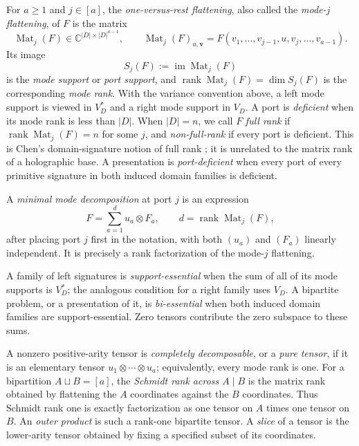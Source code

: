 \documentclass[11pt]{article}
\theoremstyle{definition}
\theoremstyle{remark}
\newcommand{\C}{\mathbb C}
\newcommand{\Mat}{\operatorname{Mat}}
\newcommand{\rank}{\operatorname{rank}}
\begin{document}
For $a\ge1$ and $j\in[a]$, the \emph{one-versus-rest flattening}, also
called the \emph{mode-$j$ flattening}, of $F$ is the matrix
\begin{equation}
  \Mat_j(F)\in\C^{|D|\times |D|^{a-1}},
  \qquad
  \Mat_j(F)_{u,\mathbf v}
  =F(v_1,\ldots,v_{j-1},u,v_j,\ldots,v_{a-1}).
  \label{eq:flattening-definition}
\end{equation}
Its image
\begin{equation}
  S_j(F):=\operatorname{im}\Mat_j(F)
  \label{eq:mode-support-definition}
\end{equation}
is the \emph{mode support} or \emph{port support}, and
$\rank\Mat_j(F)=\dim S_j(F)$ is the corresponding \emph{mode rank}.  With
the variance convention above, a left mode support is viewed in $V_D^*$
and a right mode support in $V_D$.  A port is \emph{deficient} when its
mode rank is less than $|D|$.  When $|D|=n$, we call $F$ \emph{full rank}
if $\rank\Mat_j(F)=n$ for some $j$, and \emph{non-full-rank} if every port
is deficient.  This is Chen's domain-signature notion of full rank
\cite{Chen2016}; it is unrelated to the matrix rank of a holographic base.
A presentation is \emph{port-deficient} when every port of every primitive
signature in both induced domain families is deficient.

A \emph{minimal mode decomposition} at port $j$ is an expression
\[
  F=\sum_{a=1}^{d}u_a\otimes F_a,
  \qquad d=\rank\Mat_j(F),
\]
after placing port $j$ first in the notation, with both $(u_a)$ and
$(F_a)$ linearly independent.  It is precisely a rank factorization of the
mode-$j$ flattening.

A family of left signatures is \emph{support-essential} when the sum of
all of its mode supports is $V_D^*$; the analogous condition for a right
family uses $V_D$.  A bipartite problem, or a presentation of it, is
\emph{bi-essential} when both induced domain families are
support-essential.  Zero tensors contribute the zero subspace to these
sums.

A nonzero positive-arity tensor is \emph{completely decomposable}, or a
\emph{pure tensor}, if it is an elementary tensor
$u_1\otimes\cdots\otimes u_a$; equivalently, every mode rank is one.  For a
bipartition $A\sqcup B=[a]$, the \emph{Schmidt rank across $A\mid B$} is
the matrix rank obtained by flattening the $A$ coordinates against the $B$
coordinates.  Thus Schmidt rank one is exactly factorization as one tensor
on $A$ times one tensor on $B$.  An \emph{outer product} is such a
rank-one bipartite tensor.
A \emph{slice} of a tensor is the lower-arity tensor obtained by fixing a
specified subset of its coordinates.
\end{document}
